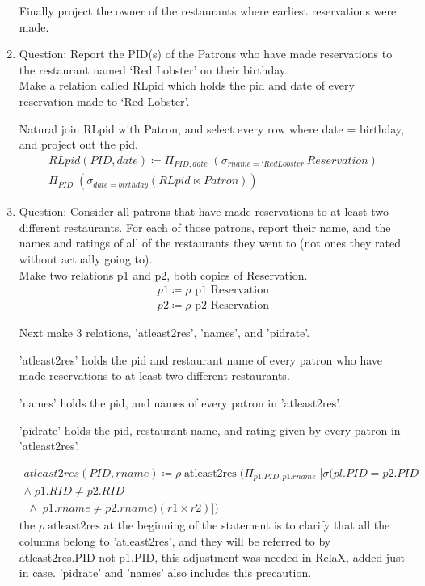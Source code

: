 \documentclass{article}
\begin{document}
\begin{enumerate}
		Finally project the owner of the restaurants where earliest reservations were made. 



\item%
Question: Report the PID(s) of the Patrons who have made reservations to the restaurant named ‘Red Lobster’
on their birthday.\\

Make a relation called RLpid which holds the pid and date of every reservation made to ‘Red Lobster’.

Natural join RLpid with Patron, and select every row where date = birthday, and project out the pid.
		\begin{align}
         RLpid(PID,date) \coloneqq \Pi_{PID, date} \; (\sigma_{rname = ‘Red Lobster’} Reservation)\\
        \Pi_{PID} \; (\sigma_{date = birthday} (RLpid \bowtie Patron))
		\end{align} 


\item%
Question: Consider all patrons that have made reservations to at least two different restaurants. For each of
those patrons, report their name, and the names and ratings of all of the restaurants they went to (not
ones they rated without actually going to).\\

Make two relations p1 and p2, both copies of Reservation.
		\begin{align}
        p1 \coloneqq \rho \text{  p1 Reservation}  \\
        p2 \coloneqq\rho \text{  p2 Reservation}
		\end{align}

Next make 3 relations, 'atleast2res', 'names', and 'pidrate'.

'atleast2res' holds the pid and restaurant name of every patron who have made reservations to at least two different restaurants.

'names' holds the pid, and names of every patron in 'atleast2res'.

'pidrate' holds the pid, restaurant name, and rating given by every patron in 'atleast2res'.

		\begin{align}
         atleast2res(PID,rname)\coloneqq \rho \; \text{atleast2res} \;(\Pi_{p1.PID, p1.rname} \; [\sigma (pl.PID = p2.PID \\ \wedge \; p1.RID \neq p2.RID \\ \; \wedge \; p1.rname \neq p2.rname) (r1 \times r2) ])         
		\end{align}
		the $\rho \; \text{atleast2res}$ at the beginning of the statement is to clarify that all the columns belong to 'atleast2res', and they will be referred to by atleast2res.PID not p1.PID, this adjustment was needed in RelaX, added just in case.
'pidrate' and 'names' also includes this precaution.


\end{enumerate}
\end{document}
